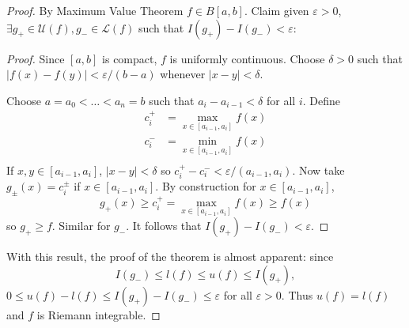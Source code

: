 \documentclass[a4paper]{article}
\newcommand*{\riem}[1]{\mathcal{#1}}
\theoremstyle{definition}
\begin{document}
\begin{proof}
  By Maximum Value Theorem \(f \in B[a, b]\). Claim given \(\varepsilon > 0\), \(\exists g_+ \in \riem U(f), g_- \in \riem L(f)\) such that \(I(g_+) - I(g_-) < \varepsilon\):
  \begin{proof}
    Since \([a, b]\) is compact, \(f\) is uniformly continuous. Choose \(\delta > 0 \) such that \(|f(x) - f(y)| < \varepsilon/(b-a)\) whenever \(|x - y| < \delta\).
    
    Choose \(a = a_0 < \dots < a_n = b\) such that \(a_i - a_{i-1} < \delta\) for all \(i\). Define
    \begin{align*}
      c_i^+ &= \max_{x \in [a_{i-1}, a_i]} f(x) \\
      c_i^- &= \min_{x \in [a_{i-1}, a_i]} f(x) \\
    \end{align*}
    If \(x, y \in [a_{i-1}, a_i]\), \(|x - y| < \delta\) so \(c_i^+ - c_i^- < \varepsilon/(a_{i-1}, a_i)\). Now take \(g_\pm(x) = c_i^\pm\) if \(x \in [a_{i-1}, a_i]\). By construction for \(x \in [a_{i-1}, a_i]\),
    \[
      g_+(x) \geq c_i^+ = \max_{x \in [a_{i-1}, a_i]}f(x) \geq f(x)
    \]
    so \(g_+ \geq f\). Similar for \(g_-\). It follows that \(I(g_+) - I(g_-) < \varepsilon\).
  \end{proof}

  With this result, the proof of the theorem is almost apparent: since
  \[
    I(g_-) \leq l(f) \leq u(f) \leq I(g_+),
  \]
  \(0 \leq u(f) - l(f) \leq I(g_+) - I(g_-) \leq \varepsilon\) for all \(\varepsilon > 0\). Thus \(u(f) = l(f)\) and \(f\) is Riemann integrable.
  
\end{proof}
\end{document}
